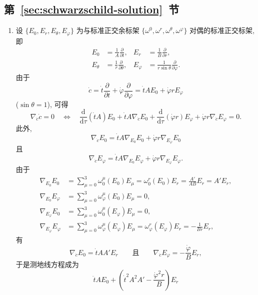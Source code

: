 \subsection{\texorpdfstring{第~\ref{sec:schwarzschild-solution}~节}{Schwarzschild 解}}\label{subsec:solutions-schwarzschild-solution}

\begin{description}[font=\normalfont,leftmargin=2em,labelwidth=1.5em]
\begin{enumerate}[label=(\alph*),ref=\alph*,leftmargin=*]
\item 设 $\{E_0,E_r,E_\theta,E_\varphi\}$ 为与标准正交余标架 $\{\omega^0,\omega^r,\omega^\theta,\omega^\varphi\}$ 对偶的标准正交标架, 即
\begin{align*}
  E_0&=\frac{1}{A}\frac{\partial}{\partial t},&
  E_r&=\frac{1}{B}\frac{\partial}{\partial r},\\
  E_\theta&=\frac{1}{r}\frac{\partial}{\partial\theta},&
  E_\varphi&=\frac{1}{r\sin\theta}\frac{\partial}{\partial\varphi}.
\end{align*}
由于
\[
  \dot c=\dot t\frac{\partial}{\partial t}+\dot\varphi\frac{\partial}{\partial\varphi}
        =\dot t A E_0+\dot\varphi r E_\varphi
\]
($\sin\theta=1$), 可得
\[
  \nabla_{\dot c}\dot c=0
  \quad\Longleftrightarrow\quad
  \frac{\mathrm{d}}{\mathrm{d}\tau}(\dot t A)E_0+\dot t A\nabla_{\dot c}E_0
    +\frac{\mathrm{d}}{\mathrm{d}\tau}(\dot\varphi r)E_\varphi
    +\dot\varphi r\nabla_{\dot c}E_\varphi=0.
\]
此外,
\[
  \nabla_{\dot c}E_0=\dot t A\nabla_{E_0}E_0+\dot\varphi r\nabla_{E_\varphi}E_0
\]
且
\[
  \nabla_{\dot c}E_\varphi=\dot t A\nabla_{E_0}E_\varphi+\dot\varphi r\nabla_{E_\varphi}E_\varphi.
\]
由于
\begin{align*}
  \nabla_{E_0}E_0&=\sum_{\mu=0}^3\omega_0^\mu(E_0)E_\mu
      =\omega_0^r(E_0)E_r=\frac{A'}{AB}E_r=A'E_r,\\
  \nabla_{E_0}E_\varphi&=\sum_{\mu=0}^3\omega_\varphi^\mu(E_0)E_\mu=0,\\
  \nabla_{E_\varphi}E_0&=\sum_{\mu=0}^3\omega_0^\mu(E_\varphi)E_\mu=0,\\
  \nabla_{E_\varphi}E_\varphi&=\sum_{\mu=0}^3\omega_\varphi^\mu(E_\varphi)E_\mu
      =\omega_\varphi^r(E_\varphi)E_r=-\frac{1}{Br}E_r,
\end{align*}
有
\[
  \nabla_{\dot c}E_0=\dot t AA'E_r
  \qquad\text{且}\qquad
  \nabla_{\dot c}E_\varphi=-\frac{\dot\varphi}{B}E_r,
\]
于是测地线方程成为
\[
  \ddot t A E_0+\left(\dot t^2A^2A'-\frac{\dot\varphi^2r}{B}\right)E_r
\]
\end{enumerate}
\end{description}
